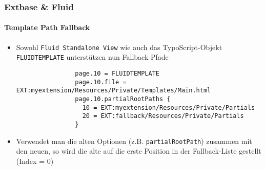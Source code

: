 %

\begin{frame}[fragile]
	\frametitle{Extbase \& Fluid}
	\framesubtitle{Template Path Fallback}

	\lstset{
		basicstyle=\tiny\ttfamily
	}

	\begin{itemize}

		\item Sowohl \texttt{Fluid Standalone View} wie auch das TypoScript-Objekt
			\texttt{FLUIDTEMPLATE} unterstützen nun Fallback Pfade

			\begin{lstlisting}
				page.10 = FLUIDTEMPLATE
				page.10.file = EXT:myextension/Resources/Private/Templates/Main.html
				page.10.partialRootPaths {
				  10 = EXT:myextension/Resources/Private/Partials
				  20 = EXT:fallback/Resources/Private/Partials
				}
			\end{lstlisting}

		\item Verwendet man die alten Optionen (z.B. \texttt{partialRootPath})
			zusammen mit den neuen, so wird die alte auf die erste Position in der
			Fallback-Liste gestellt (Index = 0)

	\end{itemize}

\end{frame}


